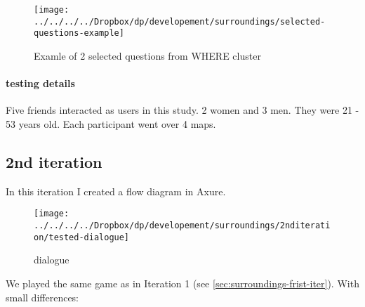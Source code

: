 				\begin{figure}[th]
					\centering
					\texttt{[image: ../../../../Dropbox/dp/developement/surroundings/selected-questions-example]}
					\caption{Examle of 2 selected questions from WHERE cluster}
					\label{fig:clusteredquestions}
				\end{figure}
			
				\paragraph{testing details}
					Five friends interacted as users in this study. 2 women and 3 men. They were 21 - 53 years old. Each participant went over 4 maps.
			
			\subsection{2nd iteration}
				\label{sec:decsribe-surroundings-2nd-iter}
				In this iteration I created a flow diagram in Axure\cite{axure}. 
				
				\begin{figure}[ht]
					\centering
					\texttt{[image: ../../../../Dropbox/dp/developement/surroundings/2nditeration/tested-dialogue]}
					\caption[]{dialogue}
					\label{fig:tested-dialogue}
				\end{figure}
			
		
				We played the same game as in Iteration 1 (see \ref{sec:surroundings-frist-iter}). With small differences:
				
